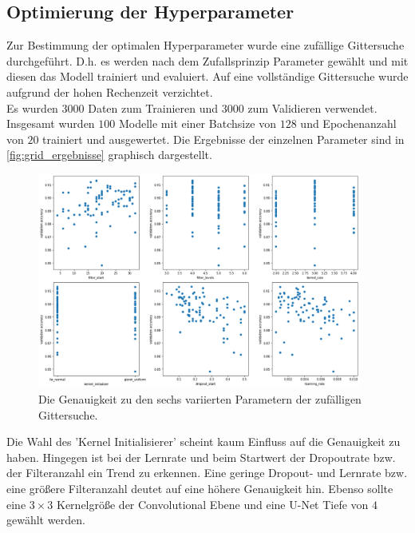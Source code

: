 \subsection{Optimierung der Hyperparameter}
\label{sec:Hyperparameter}
Zur Bestimmung der optimalen Hyperparameter wurde eine zufällige Gittersuche durchgeführt.
D.h. es werden nach dem Zufallsprinzip Parameter gewählt und mit diesen das Modell trainiert und evaluiert.
Auf eine vollständige Gittersuche wurde aufgrund der hohen Rechenzeit verzichtet.
\\
Es wurden $3000$ Daten zum Trainieren und $3000$ zum Validieren verwendet.
Insgesamt wurden $100$ Modelle mit einer Batchsize von $128$ und Epochenanzahl von $20$ trainiert und ausgewertet.
Die Ergebnisse der einzelnen Parameter sind in \autoref{fig:grid_ergebnisse} graphisch dargestellt.
\begin{figure}
    \centering
    \includegraphics[width=0.95\textwidth]{content/img/grid_ergebnisse.png}
    \caption{Die Genauigkeit zu den sechs variierten Parametern der zufälligen Gittersuche.}
    \label{fig:grid_ergebnisse}
\end{figure}
\FloatBarrier
Die Wahl des 'Kernel Initialisierer' scheint kaum Einfluss auf die Genauigkeit zu haben.
Hingegen ist bei der Lernrate und beim Startwert der Dropoutrate bzw. der Filteranzahl ein Trend zu erkennen.
Eine geringe Dropout- und Lernrate bzw. eine größere Filteranzahl deutet auf eine höhere Genauigkeit hin.
Ebenso sollte eine $3\times3$ Kernelgröße der Convolutional Ebene und eine U-Net Tiefe von $4$ gewählt werden.

